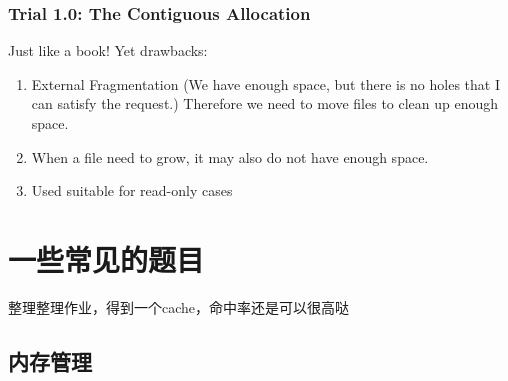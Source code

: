 \documentclass[]{report}
\begin{document}
		\subsection{Trial 1.0: The Contiguous Allocation}
		Just like a book! Yet drawbacks:
		\begin{enumerate}
			\item External Fragmentation (We have enough space, but there is no holes that I can satisfy the request.) Therefore we need to move files to clean up enough space.
			\item When a file need to grow, it may also do not have enough space.
			\item Used suitable for read-only cases
		\end{enumerate}

	\chapter{一些常见的题目}
	整理整理作业，得到一个cache，命中率还是可以很高哒
	\section{内存管理}
\end{document}

